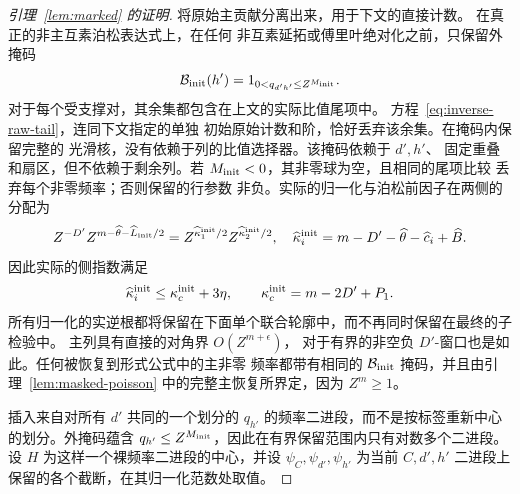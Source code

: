 \documentclass[11pt,a4paper]{article}
\numberwithin{equation}{section}
\numberwithin{figure}{section}
\theoremstyle{definition}
\theoremstyle{remark}
\begin{document}
\begin{proof}[引理~\ref{lem:marked} 的证明]
将原始主贡献分离出来，用于下文的直接计数。
在真正的非主互素泊松表达式上，在任何
非互素延拓或傅里叶绝对化之前，只保留外掩码
\[
 \mathcal B_{\rm init}(h')=1_{0<q_{d'h'}\le Z^{M_{\rm init}}}.
\]
对于每个受支撑对，其余集都包含在上文的实际比值尾项中。
方程~\eqref{eq:inverse-raw-tail}，连同下文指定的单独
初始原始计数和阶，恰好丢弃该余集。在掩码内保留完整的
光滑核，没有依赖于列的比值选择器。该掩码依赖于 \(d',h'\)、
固定重叠和扇区，但不依赖于剩余列。若
\(M_{\rm init}<0\)，其非零球为空，且相同的尾项比较
丢弃每个非零频率；否则保留的行参数
非负。实际的归一化与泊松前因子在两侧的分配为
\[
 Z^{-D'}Z^{m-\widehat\theta-\widehat L_{\rm init}/2}
   =Z^{\widehat\kappa_1^{\rm init}/2}
      Z^{\widehat\kappa_2^{\rm init}/2},
 \quad
 \widehat\kappa_i^{\rm init}=m-D'-\widehat\theta-\widehat c_i+\widehat B.
\]
因此实际的侧指数满足
\begin{equation}\label{eq:initial-poisson-prefactor}
 \widehat\kappa_i^{\rm init}\le\kappa_c^{\rm init}+3\eta,
 \qquad \kappa_c^{\rm init}=m-2D'+P_1.
\end{equation}
所有归一化的实逆根都将保留在下面单个联合轮廓中，而不再同时保留在最终的子检验中。
主列具有直接的对角界 \(O(Z^{m+\epsilon})\)，
对于有界的非空负 \(D'\)-窗口也是如此。任何被恢复到形式公式中的主非零
频率都带有相同的
\(\mathcal B_{\rm init}\) 掩码，并且由引理~\ref{lem:masked-poisson} 中的完整主恢复所界定，因为 \(Z^m\ge1\)。

插入来自对所有
\(d'\) 共同的一个划分的 \(q_{h'}\) 的频率二进段，而不是按标签重新中心的划分。外掩码蕴含
\(q_{h'}\le Z^{M_{\rm init}}\)，因此在有界保留范围内只有对数多个二进段。设 \(H\) 为这样一个裸频率二进段的中心，并设 \(\psi_C,\psi_{d'},\psi_{h'}\)
为当前 \(C,d',h'\) 二进段上保留的各个截断，在其归一化范数处取值。


\end{proof}
\end{document}
